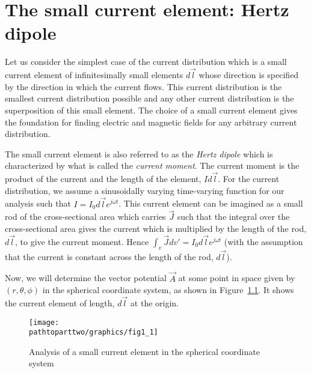 \chapter{The small current element: Hertz dipole}
Let us consider the simplest case of the current distribution which is a small current element of infinitesimally small elements $d\vec{l}$ whose direction is specified by the direction in which the current flows. This current distribution is the smallest current distribution possible and any other current distribution is the superposition of this small element. The choice of a small current element gives the foundation for finding electric and magnetic fields for any arbitrary current distribution.

The small current element is also referred to as the \emph{Hertz dipole} which is characterized by what is called the \emph{current moment}. The current moment is the product of the current and the length of the element, $Id\vec{l}$. For the current distribution, we assume a sinusoidally varying time-varying function for our analysis such that $I = I_0d\vec{l}e^{j\omega t}$. This current element can be imagined as a small rod of the cross-sectional area which carries $\vec{J}$ such that the integral over the cross-sectional area gives the current which is multiplied by the length of the rod, $d\vec{l}$, to give the current moment. Hence $\int_v\vec{J}dv' = I_0d\vec{l}e^{j\omega t}$ (with the assumption that the current is constant across the length of the rod, $d\vec{l}$). 

Now, we will determine the vector potential $\vec{A}$ at some point in space given by $(r, \theta, \phi)$ in the spherical coordinate system, as shown in Figure~\ref{fig:small_current_element}. It shows the current element of length, $d\vec{l}$ at the origin.
\begin{figure}[h]
\texttt{[image: \\pathtoparttwo/graphics/fig1\_1]}
\centering
\caption{Analysis of a small current element in the spherical coordinate system}
\label{fig:small_current_element}
\end{figure}


